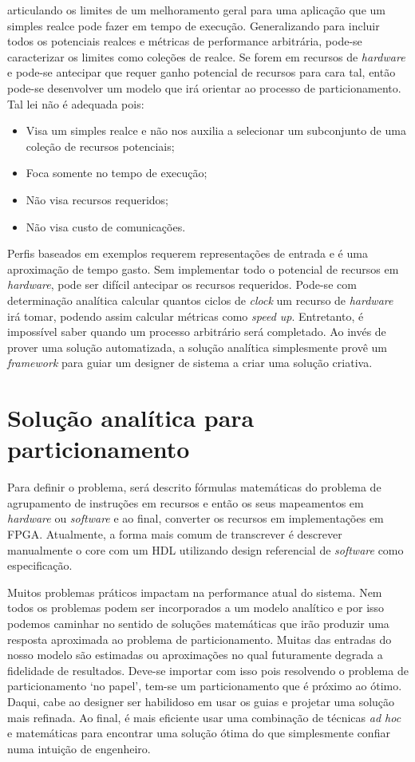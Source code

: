 articulando os limites de um melhoramento geral para uma aplicação que um simples realce pode fazer em tempo de execução. Generalizando para incluir todos os potenciais realces e métricas de performance arbitrária, pode-se caracterizar os limites como coleções de realce. Se forem em recursos de \textit{hardware} e pode-se antecipar que requer ganho potencial de recursos para cara tal, então pode-se desenvolver um modelo que irá orientar ao processo de particionamento. Tal lei não é adequada pois:
\begin{itemize}
\item Visa um simples realce e não nos auxilia a selecionar um subconjunto de uma coleção de recursos potenciais;
\item Foca somente no tempo de execução;
\item Não visa recursos requeridos;
\item Não visa custo de comunicações.
\end{itemize}

Perfis baseados em exemplos requerem representações de entrada e é uma aproximação de tempo gasto. Sem implementar todo o potencial de recursos em \textit{hardware}, pode ser difícil antecipar os recursos requeridos. Pode-se com determinação analítica calcular quantos ciclos de \textit{clock} um recurso de \textit{hardware} irá tomar, podendo assim calcular métricas como \textit{speed up}. Entretanto, é impossível saber quando um processo arbitrário será completado. Ao invés de prover uma solução automatizada, a solução analítica simplesmente provê um \textit{framework} para guiar um designer de sistema a criar uma solução criativa.



\section{Solução analítica para particionamento}

Para definir o problema, será descrito fórmulas matemáticas do problema de agrupamento de instruções em recursos e então os seus mapeamentos em \textit{hardware} ou \textit{software} e ao final, converter os recursos em implementações em FPGA. Atualmente, a forma mais comum de transcrever é descrever manualmente o core com um HDL utilizando design referencial de \textit{software} como especificação.

Muitos problemas práticos impactam na performance atual do sistema. Nem todos os problemas podem ser incorporados a um modelo analítico e por isso podemos caminhar no sentido de soluções matemáticas que irão produzir uma resposta aproximada ao problema de particionamento. Muitas das entradas do nosso modelo são estimadas ou aproximações no qual futuramente degrada a fidelidade de resultados. Deve-se importar com isso pois resolvendo o problema de particionamento `no papel’, tem-se um particionamento que é próximo ao ótimo. Daqui, cabe ao designer ser habilidoso em usar os guias e projetar uma solução mais refinada. Ao final, é mais eficiente usar uma combinação de técnicas \textit{ad hoc} e matemáticas para encontrar uma solução ótima do que simplesmente confiar numa intuição de engenheiro.

